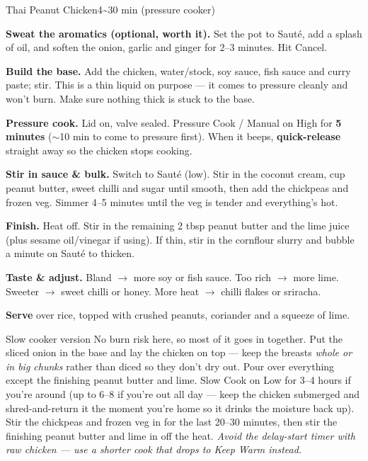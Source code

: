 \begin{recipebox}{Thai Peanut Chicken}{4}{\textasciitilde30 min (pressure cooker)}
\begin{method}
  \item \textbf{Sweat the aromatics (optional, worth it).} Set the pot to
        Saut\'e, add a splash of oil, and soften the onion, garlic and ginger
        for 2--3 minutes. Hit Cancel.
  \item \textbf{Build the base.} Add the chicken, water/stock, soy sauce, fish
        sauce and curry paste; stir. This is a thin liquid on purpose --- it
        comes to pressure cleanly and won't burn. Make sure nothing thick is
        stuck to the base.
  \item \textbf{Pressure cook.} Lid on, valve sealed. Pressure Cook / Manual on
        High for \textbf{5 minutes} ($\sim$10 min to come to pressure first).
        When it beeps, \textbf{quick-release} straight away so the chicken stops
        cooking.
  \item \textbf{Stir in sauce \& bulk.} Switch to Saut\'e (low). Stir in the
        coconut cream,  cup peanut butter, sweet chilli and sugar
        until smooth, then add the chickpeas and frozen veg. Simmer 4--5 minutes
        until the veg is tender and everything's hot.
  \item \textbf{Finish.} Heat off. Stir in the remaining 2 tbsp peanut butter
        and the lime juice (plus sesame oil/vinegar if using). If thin, stir in
        the cornflour slurry and bubble a minute on Saut\'e to thicken.
  \item \textbf{Taste \& adjust.} Bland $\rightarrow$ more soy or fish sauce.
        Too rich $\rightarrow$ more lime. Sweeter $\rightarrow$ sweet chilli or
        honey. More heat $\rightarrow$ chilli flakes or sriracha.
  \item \textbf{Serve} over rice, topped with crushed peanuts, coriander and a
        squeeze of lime.
\end{method}

\begin{variationbox}{Slow cooker version}
No burn risk here, so most of it goes in together. Put the sliced onion in the
base and lay the chicken on top --- keep the breasts \emph{whole or in big
chunks} rather than diced so they don't dry out. Pour over everything except the
finishing peanut butter and lime. Slow Cook on Low for 3--4 hours if you're
around (up to 6--8 if you're out all day --- keep the chicken submerged and
shred-and-return it the moment you're home so it drinks the moisture back up).
Stir the chickpeas and frozen veg in for the last 20--30 minutes, then stir the
finishing peanut butter and lime in off the heat. \emph{Avoid the delay-start
timer with raw chicken --- use a shorter cook that drops to Keep Warm instead.}
\end{variationbox}


\end{recipebox}
